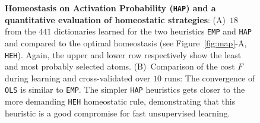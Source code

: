 \documentclass[draft]{article} %
\newcommand{\seeFig}[1]{Figure~\ref{fig:#1}}%
\begin{document}
\begin{figure}%
\caption{
{\bf Homeostasis on Activation Probability (\texttt{HAP}) and a quantitative evaluation of homeostatic strategies}: %
 {\sf (A)}~$18$ from the $441$ dictionaries learned for the two heuristics \texttt{EMP} and \texttt{HAP} and compared to the optimal homeostasis (see \seeFig{map}-A, \texttt{HEH}).
 Again, the upper and lower row respectively show the least and most probably selected atoms.  {\sf (B)}~Comparison of the cost $F$ during learning and cross-validated over $10$ runs: The convergence of \texttt{OLS} is similar to \texttt{EMP}. The simpler \texttt{HAP} heuristics gets closer to the more demanding \texttt{HEH} homeostatic rule, demonstrating that this heuristic is a good compromise for fast unsupervised learning.
\label{fig:HAP}}%
\end{figure}%
\end{document}
